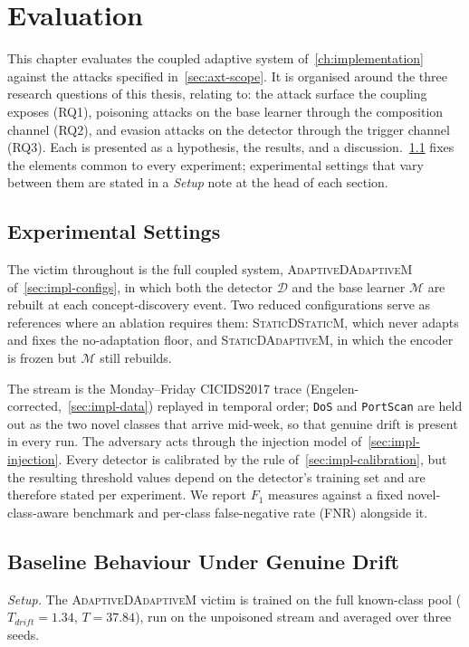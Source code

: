 \chapter{Evaluation}
\label{ch:evaluation}


This chapter evaluates the coupled adaptive system of~\cref{ch:implementation} against the attacks specified in~\cref{sec:axt-scope}. It is organised around the three research questions of this thesis, relating to: the attack surface the coupling exposes (RQ1), poisoning attacks on the base learner through the composition channel (RQ2), and evasion attacks on the detector through the trigger channel (RQ3). Each is presented as a hypothesis, the results, and a discussion.~\cref{sec:eval-settings} fixes the elements common to every experiment; experimental settings that vary between them are stated in a \textit{Setup} note at the head of each section.

\section{Experimental Settings}
\label{sec:eval-settings}
The victim throughout is the full coupled system, \textsc{AdaptiveDAdaptiveM} of~\cref{sec:impl-configs}, in which both the detector $\mathcal{D}$ and the base learner $\mathcal{M}$ are rebuilt at each concept-discovery event. Two reduced configurations serve as references where an ablation requires them: \textsc{StaticDStaticM}, which never adapts and fixes the no-adaptation floor, and \textsc{StaticDAdaptiveM}, in which the encoder is frozen but $\mathcal{M}$ still rebuilds.

The stream is the Monday--Friday CICIDS2017 trace (Engelen-corrected,~\cref{sec:impl-data}) replayed in temporal order; \texttt{DoS} and \texttt{PortScan} are held out as the two novel classes that arrive mid-week, so that genuine drift is present in every run. The adversary acts through the injection model of~\cref{sec:impl-injection}. Every detector is calibrated by the rule of~\cref{sec:impl-calibration}, but the resulting threshold values depend on the detector's training set and are therefore stated per experiment. We report $F_1$ measures against a fixed novel-class-aware benchmark and per-class false-negative rate (FNR) alongside it.

\section{Baseline Behaviour Under Genuine Drift}
\label{sec:eval-baseline}
\textit{Setup.} The \textsc{AdaptiveDAdaptiveM} victim is trained on the full known-class pool ($T_{drift} = 1.34$, $T = 37.84$), run on the unpoisoned stream and averaged over three seeds.

